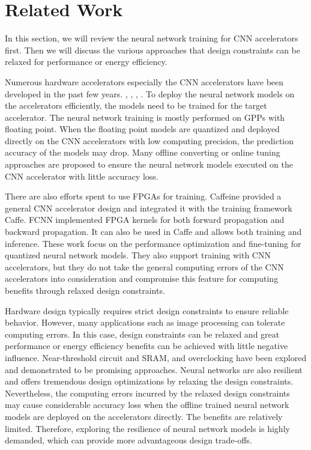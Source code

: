 \section{Related Work} \label{sec:relatedwork}
In this section, we will review the neural network training for CNN accelerators first.
Then we will discuss the various approaches that design constraints can be relaxed for
performance or energy efficiency. 

Numerous hardware accelerators especially the CNN accelerators have
been developed in the past few years. \cite{Cnvlutin_25} 
\cite{deepburing_12}, \cite{Aydonat_27}, 
\cite{Caffeine_6}, \cite{Wei_29}. To 
deploy the neural network models on the accelerators efficiently, 
the models need to be trained for the target accelerator. 
The neural network training is mostly performed on GPPs with floating point.
When the floating point models are quantized and deployed directly 
on the CNN accelerators with low computing precision, the prediction 
accuracy of the models may drop\cite{Matthieu2014_8, Hwang2014_17}. 
Many offline converting or online tuning approaches are proposed to 
ensure the neural network models executed on the CNN accelerator 
with little accuracy loss\cite{BinaryConnect_14,courbariaux2014}. 

There are also efforts spent to use FPGAs for training. 
Caffeine\cite{Caffeine_6} provided a general CNN accelerator design and integrated it with 
the training framework Caffe. FCNN\cite{fcnn_5} implemented FPGA kernels 
for both forward propagation and backward propagation. It can also be used in Caffe 
and allows both training and inference. These work focus on the performance optimization 
and fine-tuning for quantized neural network models. 
They also support training with CNN accelerators, but they do not take the general 
computing errors of the CNN accelerators into consideration and compromise this 
feature for computing benefits through relaxed design constraints.

Hardware design typically requires strict design constraints to ensure 
reliable behavior. However, many applications such as image processing 
can tolerate computing errors. In this case, design constraints can be 
relaxed and great performance or energy efficiency benefits can be achieved 
with little negative influence. Near-threshold circuit\cite{M2017NT,BH2005} and SRAM\cite{G2010SRAM,SA2008SRAM}, 
and overclocking \cite{overclock_35,overclock_Algorithm_36} have been explored and demonstrated 
to be promising approaches. Neural networks are also resilient and 
offers tremendous design optimizations by relaxing the design constraints. 
Nevertheless, the computing errors incurred by the relaxed design constraints 
may cause considerable accuracy loss when the offline 
trained neural network models are deployed on the accelerators directly. 
The benefits are relatively limited. Therefore, exploring the resilience 
of neural network models is highly demanded, which can provide more 
advantageous design trade-offs. 
